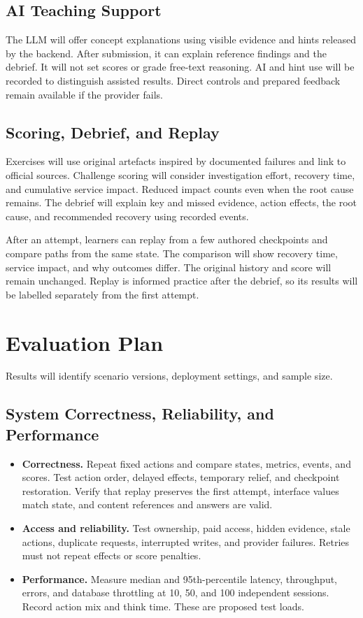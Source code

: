 \documentclass[11pt,a4paper]{article}
\begin{document}
\subsection{AI Teaching Support}
The LLM will offer concept explanations using visible evidence and hints
released by the backend. After submission, it can explain reference findings
and the debrief. It will not set scores or grade free-text reasoning. AI and
hint use will be recorded to distinguish assisted results. Direct controls
and prepared feedback remain available if the provider fails.

\subsection{Scoring, Debrief, and Replay}
Exercises will use original artefacts inspired by documented failures and
link to official sources. Challenge scoring will consider investigation effort,
recovery time, and cumulative service impact. Reduced impact counts even when
the root cause remains. The debrief will explain key and missed evidence,
action effects, the root cause, and recommended recovery using recorded events.

After an attempt, learners can replay from a few authored checkpoints and
compare paths from the same state. The comparison will show recovery time,
service impact, and why outcomes differ. The original history and score will
remain unchanged. Replay is informed practice after the debrief, so its results
will be labelled separately from the first attempt.

\section{Evaluation Plan}
\label{sec:evaluation}
Results will identify scenario versions, deployment settings, and sample size.

\subsection{System Correctness, Reliability, and Performance}
\begin{itemize}
\item \textbf{Correctness.} Repeat fixed actions and compare states, metrics,
events, and scores. Test action order, delayed effects, temporary relief, and
checkpoint restoration. Verify that replay preserves the first attempt,
interface values match state, and content references and answers are valid.
\item \textbf{Access and reliability.} Test ownership, paid access, hidden
evidence, stale actions, duplicate requests, interrupted writes, and provider
failures. Retries must not repeat effects or score penalties.
\item \textbf{Performance.} Measure median and 95th-percentile latency,
throughput, errors, and database throttling at 10, 50, and 100 independent
sessions. Record action mix and think time. These are proposed test loads.
\end{itemize}
\end{document}
